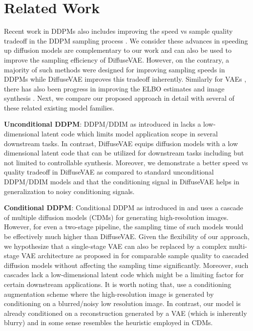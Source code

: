 \documentclass[10pt]{article} \usepackage[accepted]{tmlr}
\begin{document}
\section{Related Work}
\label{sec:appendix_related}
Recent work in DDPMs also includes improving the speed vs sample quality tradeoff in the DDPM sampling process \citep{song2021denoising, watson2021learning, luhman2021knowledge, salimans2022progressive, xiao2022tackling}. We consider these advances in speeding up diffusion models are complementary to our work and can also be used to improve the sampling efficiency of DiffuseVAE. However, on the contrary, a majority of such methods were designed for improving sampling speeds in DDPMs while DiffuseVAE improves this tradeoff inherently. Similarly for VAEs \citep{kingma2014autoencoding,rezende2016variational}, there has also been progress in improving the ELBO estimates \citep{sinha2021consistency, burda2016importance, masrani2021thermodynamic}  and image synthesis \citep{child2021deep, vahdat2021nvae, lee2020highfidelity, xiao2021vaebm}. Next, we compare our proposed approach in detail with several of these related existing model families.

\noindent
\textbf{Unconditional DDPM}: DDPM/DDIM as introduced in \citep{ho2020denoising, song2021denoising} lacks a low-dimensional latent code which limits model application scope in several downstream tasks. In contrast, DiffuseVAE equips diffusion models with a low dimensional latent code that can be utilized for downstream tasks including but not limited to controllable synthesis. Moreover, we demonstrate a better speed vs quality tradeoff in DiffuseVAE as compared to standard unconditional DDPM/DDIM models and that the conditioning signal in DiffuseVAE helps in generalization to noisy conditioning signals.

\noindent
\textbf{Conditional DDPM}:
Conditional DDPM as introduced in \citep{ho2021cascaded} and \citep{saharia2021image} uses a cascade of multiple diffusion models (CDMs) for generating high-resolution images. However, for even a two-stage pipeline, the sampling time of such models would be effectively much higher than DiffuseVAE. Given the flexibility of our approach, we hypothesize that a single-stage VAE can also be replaced by a complex multi-stage VAE architecture as proposed in \citep{child2021deep, vahdat2021nvae} for comparable sample quality to cascaded diffusion models without affecting the sampling time significantly. Moreover, such cascades lack a low-dimensional latent code which might be a limiting factor for certain downstream applications. It is worth noting that, \citep{ho2021cascaded} use a conditioning augmentation scheme where the high-resolution image is generated by conditioning on a blurred/noisy low resolution image. In contrast, our model is already conditioned on a reconstruction generated by a VAE (which is inherently blurry) and in some sense resembles the heuristic employed in CDMs.
\end{document}
